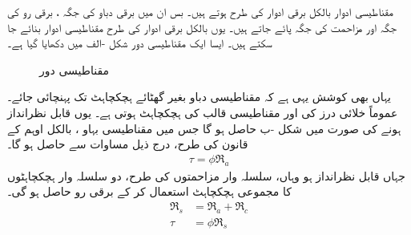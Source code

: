 مقناطیسی ادوار بالکل برقی ادوار کی طرح ہوتے ہیں۔ بس ان میں برقی دباو  کی جگہ   ، برقی رو   کی جگہ    اور مزاحمت  کی جگہ     پائے جاتے ہیں۔ یوں  بالکل برقی ادوار کی طرح مقناطیسی ادوار بنائے جا سکتے ہیں۔  ایسا ایک مقناطیسی دور شکل -الف میں دکھایا گیا ہے۔
\begin{figure}
\centering
\begin{subfigure}[b]{0.40\textwidth}
\centering
{}%
\caption{}
\end{subfigure}\hfill
\begin{subfigure}[b]{0.50\textwidth}
\centering
{}
\caption{}
\end{subfigure}
\caption{مقناطیسی دور}
\label{شکل_مقناطیسی__مقناطیسی_سلسلہ_وار_دور}
\end{figure}
%
یہاں بھی کوشش یہی ہے کہ  مقناطیسی دباو   بغیر گھٹائے ہچکچاہٹ  تک پہنچائی جائے۔ عموماً  خلائی درز کی  اور  مقناطیسی قالب کی ہچکچاہٹ ہوتی ہے۔ یوں  قابل نظرانداز ہونے کی صورت میں  شکل -ب حاصل ہو گا جس میں مقناطیسی بہاو ، بالکل اوہم کے قانون کی طرح، درج ذیل مساوات سے حاصل ہو گا۔
\begin{align}\label{مساوات_مقناطیسی_دور_قانون_اوہم}
\tau=\phi \Re_a
\end{align}
جہاں   قابل  نظرانداز ہو وہاں، سلسلہ وار مزاحمتوں کی طرح،  دو سلسلہ وار ہچکچاہٹوں کا مجموعی ہچکچاہٹ    استعمال کر کے برقی رو حاصل ہو گی۔
\begin{align}
\Re_s&=\Re_a+\Re_c\\
\tau&=\phi \Re_s \label{مساوات_مقناطیسی_دور_مقناطیسی_اوہم_قانون}
\end{align}

